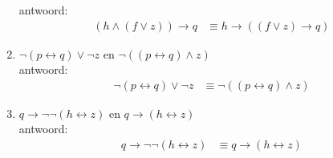 \begin{answer}
\begin{enumerate}[label=\textit{\alph*.}]
antwoord:
\begin{align}
(h\wedge (f\vee z)) \rightarrow q &\equiv h \rightarrow ((f\vee z) \rightarrow q) \tag{St-2.3.2:15}
\end{align}
\item $\neg (p\leftrightarrow q)\lor \neg z$ en $\neg ((p\leftrightarrow q) \land z)$ \\
antwoord:
\begin{align}
\neg (p\leftrightarrow q)\vee \neg z &\equiv \neg ((p\leftrightarrow q) \wedge z) \tag{St-2.3.2:10}
\end{align}
\item $q \rightarrow \neg \neg (h \leftrightarrow z) $ en $q \rightarrow (h \leftrightarrow z)$ \\
antwoord:
\begin{align}
q\rightarrow \neg \neg (h\leftrightarrow z) &\equiv q \rightarrow (h \leftrightarrow z) \tag{St-2.3.2: 1}
\end{align}
\end{enumerate}
\end{answer}

